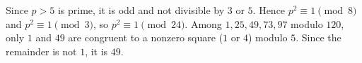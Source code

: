 Since $p>5$ is prime, it is odd and not divisible by $3$ or $5$. Hence $p^2\equiv1\pmod8$ and $p^2\equiv1\pmod3$, so $p^2\equiv1\pmod{24}$. Among $1,25,49,73,97$ modulo $120$, only $1$ and $49$ are congruent to a nonzero square ($1$ or $4$) modulo $5$. Since the remainder is not $1$, it is $\boxed{49}$.
